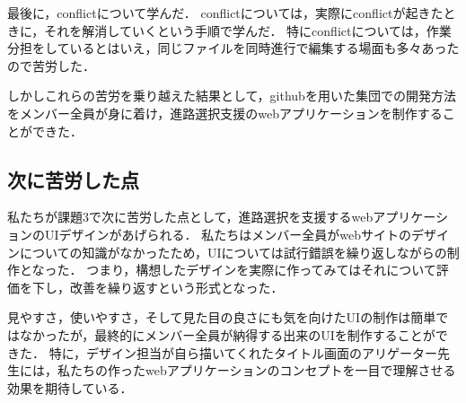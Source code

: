\documentclass[a4j, titlepage]{jarticle}
\begin{document}
\begin{itemize}
最後に，conflictについて学んだ．
conflictについては，実際にconflictが起きたときに，それを解消していくという手順で学んだ．
特にconflictについては，作業分担をしているとはいえ，同じファイルを同時進行で編集する場面も多々あったので苦労した．

しかしこれらの苦労を乗り越えた結果として，githubを用いた集団での開発方法をメンバー全員が身に着け，進路選択支援のwebアプリケーションを制作することができた．
\subsection{次に苦労した点}
私たちが課題3で次に苦労した点として，進路選択を支援するwebアプリケーションのUIデザインがあげられる．
私たちはメンバー全員がwebサイトのデザインについての知識がなかったため，UIについては試行錯誤を繰り返しながらの制作となった．
つまり，構想したデザインを実際に作ってみてはそれについて評価を下し，改善を繰り返すという形式となった．

見やすさ，使いやすさ，そして見た目の良さにも気を向けたUIの制作は簡単ではなかったが，最終的にメンバー全員が納得する出来のUIを制作することができた．
特に，デザイン担当が自ら描いてくれたタイトル画面のアリゲーター先生には，私たちの作ったwebアプリケーションのコンセプトを一目で理解させる効果を期待している．\\



\end{itemize}
\end{document}
